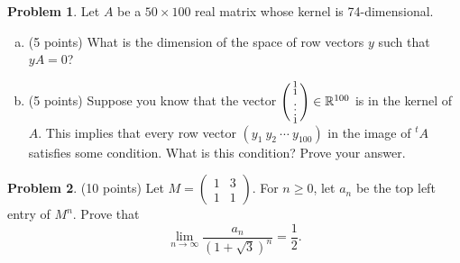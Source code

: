 \documentclass[11pt,oneside]{amsart}
\theoremstyle{definition}
\newtheorem{problem}{Problem}
\newcommand{\bR}{\mathbb{R}}
\newcommand*\colvec[1]{\begin{psmallmatrix}#1\end{psmallmatrix}}
\begin{document}
    \begin{problem}
        Let $A$ be a $50\times 100$ real matrix whose kernel is 74-dimensional.
       \begin{enumerate}[(a)]
           \item (5 points) What is the dimension of the space of row vectors $y$ such that $yA=0$?
           \vfill
           \item (5 points) Suppose you know that the vector $\colvec{1\\1\\\vdots\\1}\in \bR^{100}$ is in the kernel of $A$. This implies that every row vector $(y_1\ y_2\ \cdots\ y_{100})$ in the image of $^tA$ satisfies some condition. What is this condition? Prove your answer.
           \vfill
       \end{enumerate}
    \end{problem}
    

    \begin{problem}
        (10 points) Let $M=\begin{pmatrix}
            1&3\\1&1
        \end{pmatrix}$.
        For $n\geq 0$, let $a_n$ be the top left entry of $M^n$. Prove that
        \[\lim_{n\to\infty}\frac{a_n}{(1+\sqrt3)^n}=\frac 12.\]
    \end{problem}
    \vfill
\end{document}
